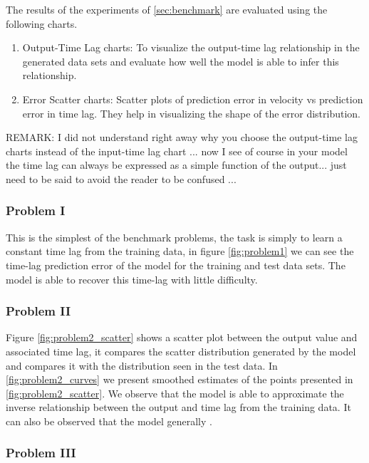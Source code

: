 \documentclass[twoside]{article}
\begin{document}
The results of the experiments of \ref{sec:benchmark} are evaluated using the following charts.

\begin{enumerate}
    \item Output-Time Lag charts: To visualize the output-time lag relationship in the generated data sets and evaluate how 
    well the model is able to infer this relationship.
    \item Error Scatter charts: Scatter plots of prediction error in velocity vs prediction error in time lag. They help in visualizing the
    shape of the error distribution.
\end{enumerate}

REMARK: I did not understand right away why you choose the output-time lag charts instead of the input-time lag chart ... now I see of course in your model the time lag can always be expressed as a simple function of the output... just need to be said to avoid the reader to be confused ...

\subsubsection{Problem I}

This is the simplest of the benchmark problems, the task is simply to learn a constant time lag from the training data, in figure \ref{fig:problem1} we can see
the time-lag prediction error of the model for the training and test data sets. The model is able to recover this time-lag with little difficulty.

\subsubsection{Problem II}

Figure \ref{fig:problem2_scatter} shows a scatter plot between the output value and associated time lag, it compares the scatter distribution generated by
the model and compares it with the distribution seen in the test data. In \ref{fig:problem2_curves} we present smoothed estimates of the points presented
in \ref{fig:problem2_scatter}. We observe that the model is able to approximate the inverse relationship between the output and time lag from the training 
data. It can also be observed that the model generally .

\subsubsection{Problem III}
\end{document}
